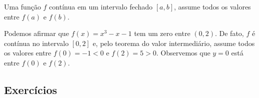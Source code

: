 \begin{teo}
  Uma função $f$ contínua em um intervalo fechado $[a, b]$, assume todos os valores entre $f(a)$ e $f(b)$.
\end{teo}

\begin{ex}
  Podemos afirmar que $f(x)=x^3-x-1$ tem um zero entre $(0, 2)$. De fato, $f$ é contínua no intervalo $[0,2]$ e, pelo teorema do valor intermediário, assume todos os valores entre $f(0)=-1<0$ e $f(2)=5>0$. Observemos que $y = 0$ está entre $f(0)$ e $f(2)$.
\end{ex}

\subsection*{Exercícios}

\emconstrucao



